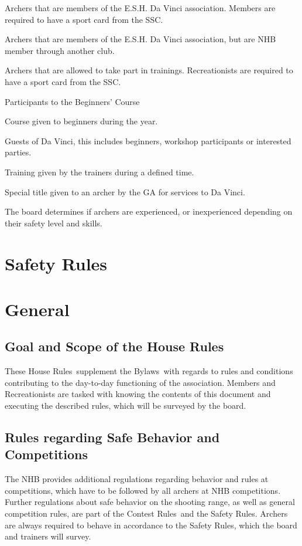 \documentclass[a4paper]{article}
\newcommand{\Asta}{Bylaws} %
\newcommand{\Ahr}{House Rules} %
\newcommand{\Asr}{Safety Rules} %
\newcommand{\Awr}{Contest Rules} %
\begin{document}
\begin{description}[font=\sffamily\bfseries, leftmargin=1cm, style=nextline]
Archers that are members of the E.S.H. Da Vinci association. Members are required to have a sport card from the SSC.
\item[External Member]
Archers that are members of the E.S.H. Da Vinci association, but are NHB member through another club.
\item[Recreationist]
Archers that are allowed to take part in trainings. Recreationists are required to have a sport card from the SSC.
\item[Beginner]
Participants to the Beginners' Course
\item[Beginners' Course] Course given to beginners during the year.
\item[Guest] Guests of Da Vinci, this includes beginners, workshop participants or interested parties.
\item[General Training] Training given by the trainers during a defined time.
\item[Honorary Member] Special title given to an archer by the GA for services to Da Vinci.
\item[Experienced - Inexperienced] The board determines if archers are experienced, or inexperienced depending on their safety level and skills.
\end{description}

\section{Safety Rules}


\section{General}
\subsection{Goal and Scope of the \Ahr}
These \Ahr\ supplement the \Asta\ with regards to rules and conditions contributing to the day-to-day functioning of the association. Members and Recreationists are tasked with knowing the contents of this document and executing the described rules, which will be surveyed by the board.

\subsection{Rules regarding Safe Behavior and Competitions}
The NHB provides additional regulations regarding behavior and rules at competitions, which have to be followed by all archers at NHB competitions. Further regulations about safe behavior on the shooting range, as well as general competition rules, are part of the \Awr\ and the \Asr . Archers are always required to behave in accordance to the \Asr , which the board and trainers will survey.
\end{document}
